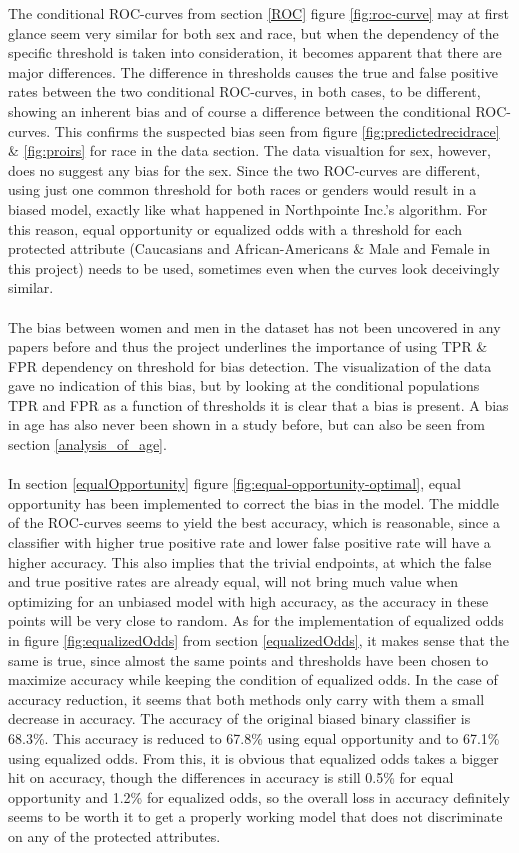 \documentclass[11pt, fleqn, titlepage]{article}
\begin{document}
	The conditional ROC-curves from section \ref{ROC} figure \ref{fig:roc-curve} may at first glance seem very similar for both sex and race, but when the dependency of the specific threshold is taken into consideration, it becomes apparent that there are major differences. The difference in thresholds causes the true and false positive rates between the two conditional ROC-curves, in both cases, to be different, showing an inherent bias and of course a difference between the conditional ROC-curves. This confirms the suspected bias seen from figure \ref{fig:predictedrecidrace} \& \ref{fig:proirs} for race in the data section. The data visualtion for sex, however, does no suggest any bias for the sex. Since the two ROC-curves are different, using just one common threshold for both races or genders would result in a biased model, exactly like what happened in Northpointe Inc.'s algorithm. For this reason, equal opportunity or equalized odds with a threshold for each protected attribute (Caucasians and African-Americans \& Male and Female in this project) needs to be used, sometimes even when the curves look deceivingly similar. \\\\
	\noindent
	The bias between women and men in the dataset has not been uncovered in any papers before and thus the project underlines the importance of using TPR \& FPR dependency on threshold for bias detection. The visualization of the data gave no indication of this bias, but by looking at the conditional populations TPR and FPR as a function of thresholds it is clear that a bias is present. A bias in age has also never been shown in a study before, but can also be seen from section \ref{analysis_of_age}.\\\\ 
	In section \ref{equalOpportunity} figure \ref{fig:equal-opportunity-optimal}, equal opportunity has been implemented to correct the bias in the model. The middle of the ROC-curves seems to yield the best accuracy, which is reasonable, since a classifier with higher true positive rate and lower false positive rate will have a higher accuracy. This also implies that the trivial endpoints, at which the false and true positive rates are already equal, will not bring much value when optimizing for an unbiased model with high accuracy, as the accuracy in these points will be very close to random. As for the implementation of equalized odds in figure \ref{fig:equalizedOdds} from section \ref{equalizedOdds}, it makes sense that the same is true, since almost the same points and thresholds have been chosen to maximize accuracy while keeping the condition of equalized odds. In the case of accuracy reduction, it seems that both methods only carry with them a small decrease in accuracy. The accuracy of the original biased binary classifier is 68.3\%. This accuracy is reduced to 67.8\% using equal opportunity and to 67.1\% using equalized odds. From this, it is obvious that equalized odds takes a bigger hit on accuracy, though the differences in accuracy is still 0.5\% for equal opportunity and 1.2\% for equalized odds, so the overall loss in accuracy definitely seems to be worth it to get a properly working model that does not discriminate on any of the protected attributes.
	
\end{document}
